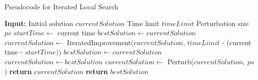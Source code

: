 \begin{algorithm}[H]
    \caption{Pseudocode for Iterated Local Search} \label{ils}
    \begin{algorithmic}[1]
        \State \textbf{Input:}
        \State \hspace{\algorithmicindent} Initial solution $currentSolution$
        \State \hspace{\algorithmicindent} Time limit $timeLimit$
        \State \hspace{\algorithmicindent} Perturbation size $ps$
        \State $startTime \gets$ current time 
        \State $bestSolution \gets currentSolution$ 
        \State $currentSolution \gets$ IteratedImprovement($currentSolution$,
        \Statex \hspace{\algorithmicindent} \hspace{\algorithmicindent}$timeLimit$ - (current time - $startTime)$)
            \State $bestSolution \gets currentSolution$ 
            \State $currentSolution \gets bestSolution$ 
        \EndIf
        \State $currentSolution \gets$ Perturb($currentSolution$, $ps$)
        \EndWhile
            \State \textbf{return} $currentSolution$
        \Else 
            \State \textbf{return} $bestSolution$
        \EndIf
    \end{algorithmic}
\end{algorithm}